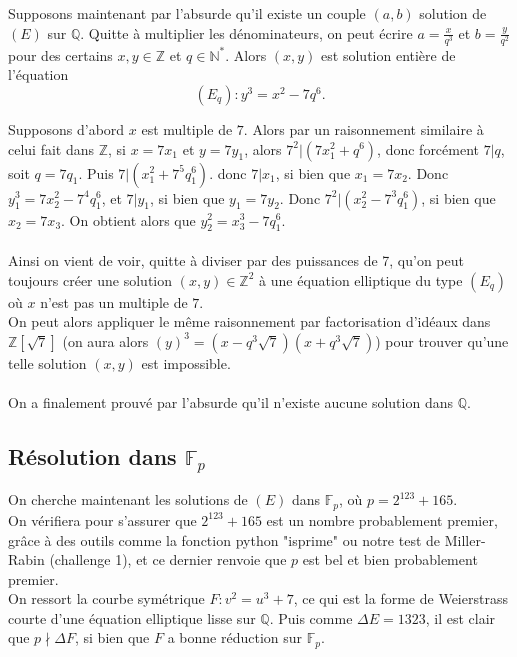 \documentclass{article}
\newcommand{\bZ}{\mathbb{Z}}
\newcommand{\bN}{\mathbb{N}}
\newcommand{\bF}{\mathbb{F}}
\newcommand{\bQ}{\mathbb{Q}}
\begin{document}
Supposons maintenant par l'absurde qu'il existe un couple $(a,b)$ solution de $(E)$ sur $\bQ$. Quitte à multiplier les dénominateurs, on peut écrire $\displaystyle a = \frac{x}{q^3}$ et $\displaystyle b = \frac{y}{q^2}$ pour des certains $x,y\in \bZ$ et $q\in \bN^*$. Alors $(x,y)$ est solution entière de l'équation \[(E_q) : y^3 = x^2 - 7q^6.\]

Supposons d'abord $x$ est multiple de $7$. Alors par un raisonnement similaire à celui fait dans $\bZ$, si $x = 7x_1$ et $y = 7y_1$, alors $7^2|(7x_1^2 + q^6)$, donc forcément $7|q$, soit $q = 7q_1$. Puis $7|(x_1^2 + 7^5q_1^6)$. donc $7|x_1$, si bien que $x_1 = 7x_2$. Donc $y_1^3 = 7x_2^2 - 7^4q_1^6$, et $7|y_1$, si bien que $y_1 = 7y_2$. Donc $7^2|(x_2^2-7^3q_1^6)$, si bien que $x_2 = 7x_3$. On obtient alors que $y_2^2 = x_3^3 - 7q_1^6$.\\ \\
Ainsi on vient de voir, quitte à diviser par des puissances de 7, qu'on peut toujours créer une solution $(x,y)\in \bZ^2$ à une équation elliptique du type $(E_q)$ où $x$ n'est pas un multiple de $7$.\\
On peut alors appliquer le même raisonnement par factorisation d'idéaux dans $\bZ[\sqrt{7}]$ (on aura alors $(y)^3 = (x-q^3\sqrt{7})(x+q^3\sqrt{7})$) pour trouver qu'une telle solution $(x,y)$ est impossible.\\ \\
On a finalement prouvé par l'absurde qu'il n'existe aucune solution dans $\bQ$.


\subsection{Résolution dans $\bF_p$}

On cherche maintenant les solutions de $(E)$ dans $\bF_p$, où $p = 2^{123}+165$.\\

On vérifiera pour s'assurer que $2^{123}+165$ est un nombre probablement premier, grâce à des outils comme la fonction python "isprime" ou notre test de Miller-Rabin (challenge 1), et ce dernier renvoie que $p$ est bel et bien probablement premier.\\

On ressort la courbe symétrique $F : v^2 = u^3 + 7$, ce qui est la forme de Weierstrass courte d'une équation elliptique lisse sur $\bQ$. Puis comme $\Delta E = 1323$, il est clair que $p\nmid \Delta F$, si bien que $F$ a bonne réduction sur $\bF_p$.
\end{document}
